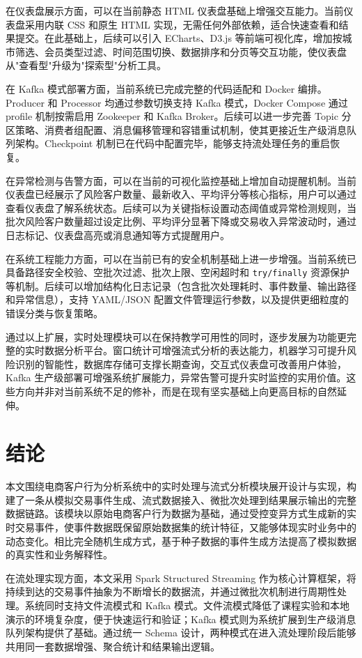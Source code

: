 \documentclass[12pt,hyperref,a4paper,UTF8]{ctexart}
\begin{document}
在仪表盘展示方面，可以在当前静态 HTML 仪表盘基础上增强交互能力。当前仪表盘采用内联 CSS 和原生 HTML 实现，无需任何外部依赖，适合快速查看和结果提交。在此基础上，后续可以引入 ECharts、D3.js 等前端可视化库，增加按城市筛选、会员类型过滤、时间范围切换、数据排序和分页等交互功能，使仪表盘从"查看型"升级为"探索型"分析工具。

在 Kafka 模式部署方面，当前系统已完成完整的代码适配和 Docker 编排。Producer 和 Processor 均通过参数切换支持 Kafka 模式，Docker Compose 通过 profile 机制按需启用 Zookeeper 和 Kafka Broker。后续可以进一步完善 Topic 分区策略、消费者组配置、消息偏移管理和容错重试机制，使其更接近生产级消息队列架构。Checkpoint 机制已在代码中配置完毕，能够支持流处理任务的重启恢复。

在异常检测与告警方面，可以在当前的可视化监控基础上增加自动提醒机制。当前仪表盘已经展示了风险客户数量、最新收入、平均评分等核心指标，用户可以通过查看仪表盘了解系统状态。后续可以为关键指标设置动态阈值或异常检测规则，当批次风险客户数量超过设定比例、平均评分显著下降或交易收入异常波动时，通过日志标记、仪表盘高亮或消息通知等方式提醒用户。

在系统工程能力方面，可以在当前已有的安全机制基础上进一步增强。当前系统已具备路径安全校验、空批次过滤、批次上限、空闲超时和 \texttt{try/finally} 资源保护等机制。后续可以增加结构化日志记录（包含批次处理耗时、事件数量、输出路径和异常信息），支持 YAML/JSON 配置文件管理运行参数，以及提供更细粒度的错误分类与恢复策略。

通过以上扩展，实时处理模块可以在保持教学可用性的同时，逐步发展为功能更完整的实时数据分析平台。窗口统计可增强流式分析的表达能力，机器学习可提升风险识别的智能性，数据库存储可支撑长期查询，交互式仪表盘可改善用户体验，Kafka 生产级部署可增强系统扩展能力，异常告警可提升实时监控的实用价值。这些方向并非对当前系统不足的修补，而是在现有坚实基础上向更高目标的自然延伸。

\section{结论}

本文围绕电商客户行为分析系统中的实时处理与流式分析模块展开设计与实现，构建了一条从模拟交易事件生成、流式数据接入、微批次处理到结果展示输出的完整数据链路。该模块以原始电商客户行为数据为基础，通过受控变异方式生成新的实时交易事件，使事件数据既保留原始数据集的统计特征，又能够体现实时业务中的动态变化。相比完全随机生成方式，基于种子数据的事件生成方法提高了模拟数据的真实性和业务解释性。

在流处理实现方面，本文采用 Spark Structured Streaming 作为核心计算框架，将持续到达的交易事件抽象为不断增长的数据流，并通过微批次机制进行周期性处理。系统同时支持文件流模式和 Kafka 模式。文件流模式降低了课程实验和本地演示的环境复杂度，便于快速运行和验证；Kafka 模式则为系统扩展到生产级消息队列架构提供了基础。通过统一 Schema 设计，两种模式在进入流处理阶段后能够共用同一套数据增强、聚合统计和结果输出逻辑。
\end{document}
